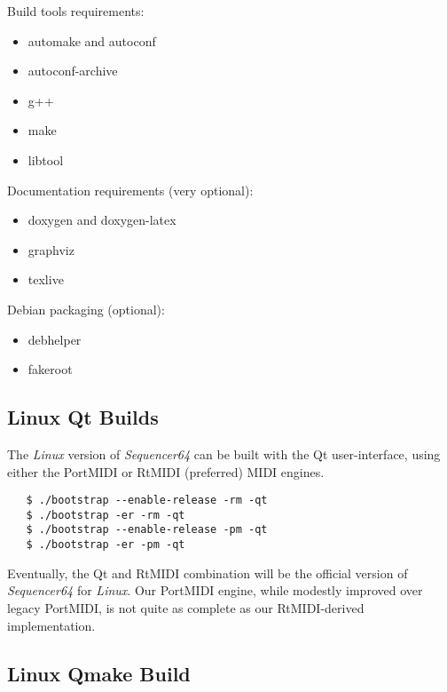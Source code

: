    Build tools requirements:

     \begin{itemize}
        \item automake and autoconf
        \item autoconf-archive
        \item g++
        \item make
        \item libtool
     \end{itemize}

   Documentation requirements (very optional):

     \begin{itemize}
        \item doxygen and doxygen-latex
        \item graphviz
        \item texlive
     \end{itemize}
      
   Debian packaging (optional):

     \begin{itemize}
        \item debhelper
        \item fakeroot
     \end{itemize}

\subsection{Linux Qt Builds}
\label{subsec:seq64_build_Qt}

   The \textsl{Linux} version of \textsl{Sequencer64} can be built with the Qt
   user-interface, using either the PortMIDI or RtMIDI (preferred) MIDI
   engines.
 
\begin{verbatim}
   $ ./bootstrap --enable-release -rm -qt
   $ ./bootstrap -er -rm -qt
   $ ./bootstrap --enable-release -pm -qt
   $ ./bootstrap -er -pm -qt
\end{verbatim}

   Eventually, the Qt and RtMIDI combination will be the official version
   of \textsl{Sequencer64} for \textsl{Linux}.
   Our PortMIDI engine, while modestly improved over legacy PortMIDI, is not
   quite as complete as our RtMIDI-derived implementation.

\subsection{Linux Qmake Build}
\label{subsec:seq64_build_qmake}

